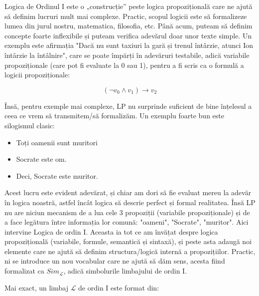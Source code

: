 Logica de Ordinul I este o „construcție” peste logica propozițională care ne ajută să definim lucruri mult mai complexe.
Practic, scopul logicii este să formalizeze lumea din jurul nostru, matematica, filosofia, etc. Până acum, puteam să definim concepte
foarte inflexibile și puteam verifica adevărul doar unor texte simple. Un exemplu este afirmația "Dacă nu sunt taxiuri la gară și trenul întârzie, atunci Ion întârzie la întâlnire",
care se poate împărți în adevăruri testabile, adică variabile propoziționale (care pot fi evaluate la 0 sau 1), pentru a fi scris ca o formulă a logicii propoziționale:

\[
	(\neg v_0 \land v_1) \to v_{2}
\]

Însă, pentru exemple mai complexe, LP nu surprinde suficient de bine înțelesul a ceea ce vrem să transmitem/să formalizăm. Un exemplu foarte bun este silogismul clasic:

\begin{itemize}
	\item Toți oamenii sunt muritori
	\item Socrate este om.
	\item Deci, Socrate este muritor.
\end{itemize}

Acest lucru este evident adevărat, și chiar am dori să fie evaluat mereu la adevăr în logica noastră, astfel încât logica să descrie perfect și formal realitatea. Însă LP nu are
niciun mecanism de a lua cele 3 propoziții (variabile propoziționale) și de a face legătura între informația lor comună: "oameni", "Socrate", "muritor". Aici intervine
Logica de ordin I. Aceasta ia tot ce am învățat despre logica propozițională (variabile, formule, semantică și sintaxă), și peste asta adaugă noi elemente care ne ajută
să definim structura/logică internă a propozițiilor. Practic, ni se introduce un nou vocabular care ne ajută să dăm sens, acesta fiind formalizat ca \( Sim_{\mathcal{L}} \),
adică simbolurile limbajului de ordin I.

Mai exact, un limbaj \( \mathcal{L} \) de ordin I este format din:

